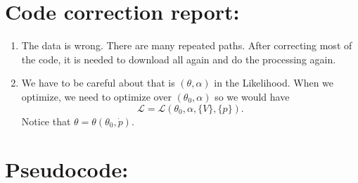 \documentclass[12pt]{article}
\begin{document}
\section{Code correction report:}

\begin{enumerate}

\item The data is wrong. There are many repeated paths. After correcting most of the code, it is needed to download all again and do the processing again.
\item We have to be careful about that is $(\theta,\alpha)$ in the Likelihood. When we optimize, we need to optimize over $(\theta_0,\alpha)$ so we would have
\begin{equation*}
\mathcal{L}=\mathcal{L}\left(\theta_0,\alpha,\{V\},\{p\}\right).
\end{equation*}
Notice that $\theta=\theta(\theta_0,\dot{p})$.

\end{enumerate}

\section{Pseudocode:}
\end{document}
